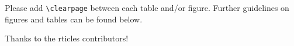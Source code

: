 \documentclass[gc, manuscript]{copernicus}
\begin{document}
Please add \texttt{\textbackslash{}clearpage} between each table and/or
figure. Further guidelines on figures and tables can be found below.
\noappendix




\begin{acknowledgements}
Thanks to the rticles contributors!
\end{acknowledgements}







\end{document}

